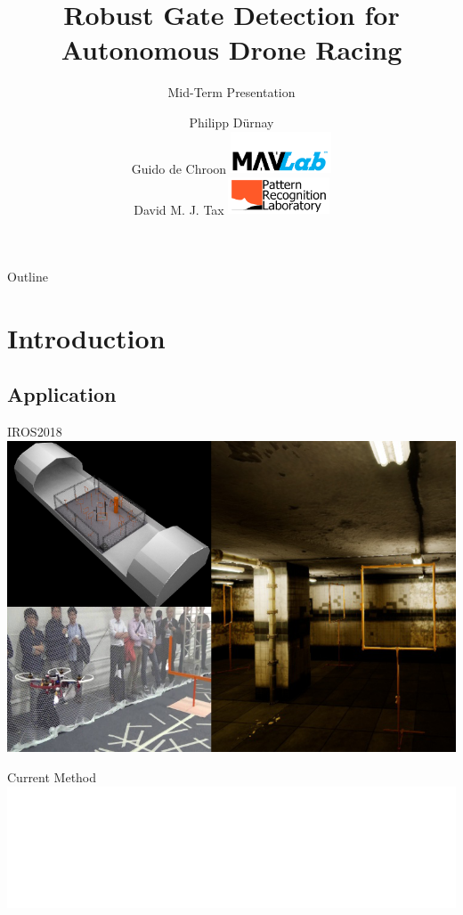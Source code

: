 \documentclass{beamer}
\title{Robust Gate Detection for Autonomous Drone Racing} %
\subtitle{Mid-Term Presentation} %
\author{Philipp Dürnay\\ \bigskip \bigskip Guido de Chroon \hfill	\includegraphics[width=3cm]{fig/mavlab}\\
	 David M. J. Tax  \hfill \includegraphics[width=3cm]{fig/prgroup}%
}
\begin{document}
  \frame{\maketitle}


  \begin{darkframes}
  	\begin{frame}{Outline}
  		\tableofcontents
  	\end{frame}
	\section{Introduction}
	\subsection{Application}
    \begin{frame}{IROS2018}
    	\includegraphics[width=\textwidth]{fig/application}
    \end{frame}
    \begin{frame}{Current Method}
       	\includegraphics[width=\textwidth]{fig/current_method}
    \end{frame}


\end{darkframes}
\end{document}
